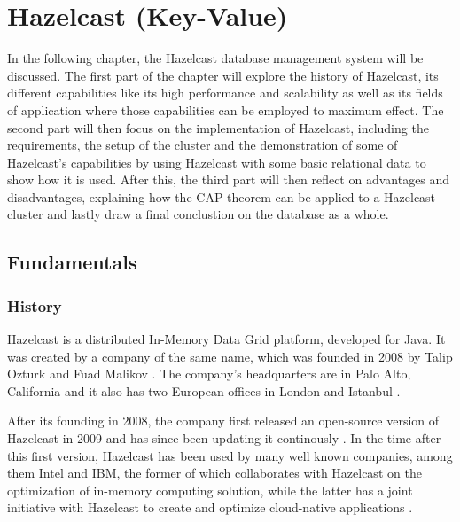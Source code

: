 
\chapter{Hazelcast (Key-Value)} \label{ch:hazelcast}

In the following chapter, the Hazelcast database management system will be discussed.
The first part of the chapter will explore the history of Hazelcast,
its different capabilities like its high performance and scalability as well as its fields of application where those capabilities can be
employed to maximum effect.
The second part will then focus on the implementation of Hazelcast, including the requirements, the setup of the cluster and the demonstration of
some of Hazelcast's capabilities by using Hazelcast with some basic relational data to show how it is used.
After this, the third part will then reflect on advantages and disadvantages, explaining how the CAP
theorem can be applied to a Hazelcast cluster and lastly draw a final conclustion on the database as a whole.

\section{Fundamentals} \label{sec:fundamentalsHazelcast}

\subsection{History} \label{subsec:historyHazelcast}

Hazelcast is a distributed In-Memory Data Grid platform, developed for Java. It was created by a company of the same name,
which was founded in 2008 by Talip Ozturk and Fuad Malikov \parencite{DatabaseofDatabases.11032023}. The company's headquarters are
in Palo Alto, California and it also has two European offices in London and Istanbul \parencite{HazelcastContact.03112022}.

After its founding in 2008, the company first released an open-source version of Hazelcast in 2009 and has since been updating it
continously \parencite{DatabaseofDatabases.11032023}. In the time after this first version, Hazelcast has been used by many well known companies,
among them Intel and IBM, the former of which collaborates with Hazelcast on the optimization of in-memory computing solution, while
the latter has a joint initiative with Hazelcast to create and optimize cloud-native applications \parencite{HazelcastPartners.270122}.

